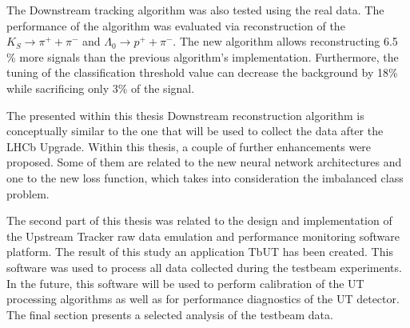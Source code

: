 The Downstream tracking algorithm was also tested using the real data. The performance of the algorithm was evaluated via reconstruction of the $K_S \rightarrow \pi^{+} + \pi^{-}$  and $\Lambda_{0} \rightarrow p^{+} + \pi^{-}$.  The new algorithm allows reconstructing 6.5 \% more signals than the previous algorithm's implementation.   
Furthermore, the tuning of the classification threshold value can decrease the background by 18\% while sacrificing only 3\% of the signal. 

The presented within this thesis Downstream reconstruction algorithm is conceptually similar to the one that will be used to collect the data after the LHCb Upgrade.  Within this thesis, a couple of further enhancements were proposed. Some of them are related to the new neural network architectures and one to the new loss function, which takes into consideration the imbalanced class problem.

The second part of this thesis was related to the design and implementation of the Upstream Tracker raw data emulation and performance monitoring software platform.  The result of this study an application TbUT has been created. This software was used to process all data collected during the testbeam experiments. In the future, this software will be used to perform calibration of the UT processing algorithms as well as for performance diagnostics of the UT detector. The final section presents a selected  analysis of the testbeam data.  